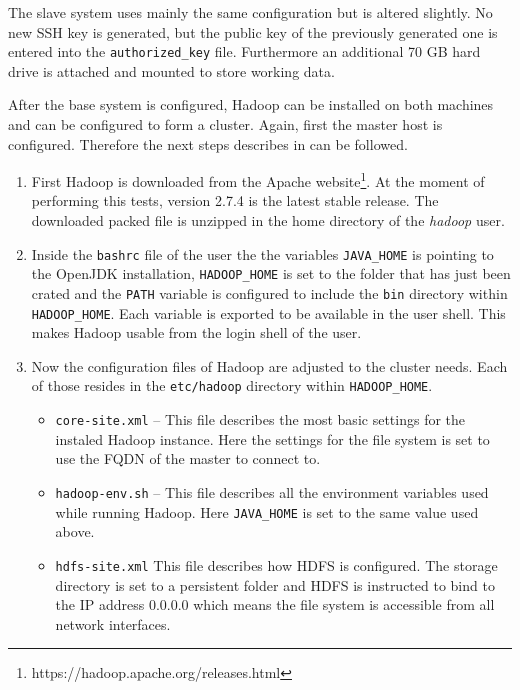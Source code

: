 The slave system uses mainly the same configuration but is altered slightly.
No new \ac{SSH} key is generated, but the public key of the previously
generated one is entered into the \texttt{authorized\_key} file. 
Furthermore an additional 70 \ac{GB} hard drive is attached 
and mounted to store working data.

After the base system is configured, Hadoop can be installed on both machines
and can be configured to form a cluster.
Again, first the master host is configured.
Therefore the next steps describes in 
\autocite[][Appendix A]{white2015hadoop}
can be followed.

\begin{enumerate}
    \item First Hadoop is downloaded from the Apache website\footnote{https://hadoop.apache.org/releases.html}. 
    At the moment of performing this tests, 
    version 2.7.4 is the latest stable release.
    The downloaded packed file is unzipped in the home directory of the \emph{hadoop} user.
    \item Inside the \texttt{bashrc} file of the user the the variables \texttt{JAVA\_HOME} is pointing to the OpenJDK installation,
    \texttt{HADOOP\_HOME} is set to the folder that has just been crated and the \texttt{PATH} variable is configured to include the \texttt{bin} directory within \texttt{HADOOP\_HOME}.
    Each variable is exported to be available in the user shell.
    This makes Hadoop usable from the login shell of the user.
    \item Now the configuration files of Hadoop are adjusted to the cluster needs. Each of those resides in the \texttt{etc/hadoop} directory within \texttt{HADOOP\_HOME}.
    \begin{itemize}
        \item \texttt{core-site.xml} -- This file describes the most basic settings for the instaled Hadoop instance. 
        Here the settings for the file system is set to use the \ac{FQDN} of the master to connect to.
        \item \texttt{hadoop-env.sh} -- This file describes all the environment variables used while running Hadoop. 
        Here \texttt{JAVA\_HOME} is set to the same value used above.
        \item \texttt{hdfs-site.xml} This file describes how \ac{HDFS} is configured. 
        The storage directory is set to a persistent folder
        and \ac{HDFS} is instructed to bind to the \ac{IP} address 0.0.0.0 
        which means the file system is accessible from all network interfaces.

\end{itemize}
\end{enumerate}
